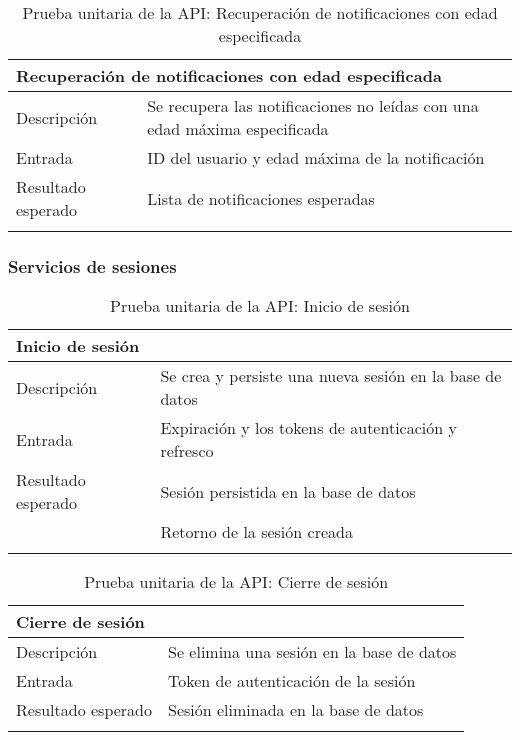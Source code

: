 \begin{longtable}{|p{} p{}|}
    \hline
    \multicolumn{2}{|l|}{\textbf{Recuperación de notificaciones con edad especificada}} \\ \hline 
    Descripción                 & Se recupera las notificaciones no leídas con una edad máxima especificada \\ \hline
    Entrada                     & ID del usuario y edad máxima de la notificación \\ \hline
    Resultado esperado          & Lista de notificaciones esperadas \\ \hline
    \caption{Prueba unitaria de la API: Recuperación de notificaciones con edad especificada}
    \label{cp:u:api:recuperar_notificaciones_edad}
\end{longtable}

\newpage
\subsubsection{Servicios de sesiones}

\begin{longtable}{|p{} p{}|}
    \hline
    \multicolumn{2}{|l|}{\textbf{Inicio de sesión}} \\ \hline 
    Descripción                 & Se crea y persiste una nueva sesión en la base de datos \\ \hline
    Entrada                     & Expiración y los tokens de autenticación y refresco \\ \hline
    Resultado esperado          & Sesión persistida en la base de datos \\
                                & Retorno de la sesión creada \\ \hline
    \caption{Prueba unitaria de la API: Inicio de sesión}
    \label{cp:u:api:inicio_sesion}
\end{longtable}

\begin{longtable}{|p{} p{}|}
    \hline
    \multicolumn{2}{|l|}{\textbf{Cierre de sesión}} \\ \hline 
    Descripción                 & Se elimina una sesión en la base de datos \\ \hline
    Entrada                     & Token de autenticación de la sesión \\ \hline
    Resultado esperado          & Sesión eliminada en la base de datos \\  \hline
    \caption{Prueba unitaria de la API: Cierre de sesión}
    \label{cp:u:api:cierre_sesion}
\end{longtable}

